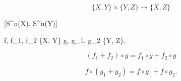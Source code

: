 
$$\{X, Y\} \times \{Y, Z\} \to \{X, Z\}$$

 [S^n(X), S^n(Y)] \times [S^n(Y), S^n(Z)] \to [S^n(X), S^n(Z)] 

 f, f_1, f_2 \in \{X, Y\}  g, g_1, g_2 \in \{Y, Z\},

$$(f_1 + f_2) \circ g = f_1 \circ g + f_2 \circ g$$


$$f \circ (g_1 + g_2) = f \circ g_1 + f \circ g_2.$$